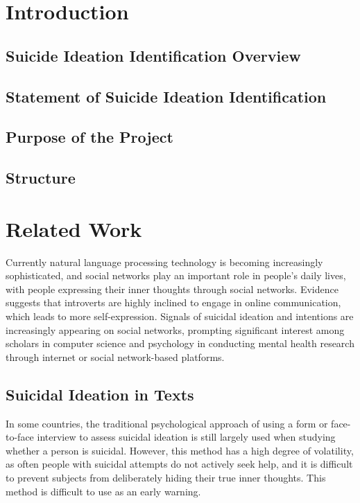 \documentclass[ %
                    author={Louis Wang},
                supervisor={Dr. Qiang Liu},
                    degree={MSc},
                     title={Identification of Suicide Ideation in Texts},
                      type={},
                      year={2024}]{dissertation}
\begin{document}
\mainmatter


\chapter{Introduction}
\label{chap:introduction}


\section{Suicide Ideation Identification Overview}

\section{Statement of Suicide Ideation Identification}

\section{Purpose of the Project}

\section{Structure}



\chapter{Related Work}
\label{chap:background}

\noindent
Currently natural language processing technology is becoming increasingly sophisticated, and social networks play an important role in people's daily lives, with people expressing their inner thoughts through social networks. 
Evidence suggests that introverts are highly inclined to engage in online communication, which leads to more self-expression. Signals of suicidal ideation and intentions are increasingly appearing on social networks, prompting significant interest among scholars in computer science and psychology in conducting mental health research through internet or social network-based platforms.

\section{Suicidal Ideation in Texts}
\noindent
In some countries, the traditional psychological approach of using a form or face-to-face interview to assess suicidal ideation is still largely used when studying whether a person is suicidal. However, this method has a high degree of volatility, as often people with suicidal attempts do not actively seek help, and it is difficult to prevent subjects from deliberately hiding their true inner thoughts. This method is difficult to use as an early warning.
\end{document}
